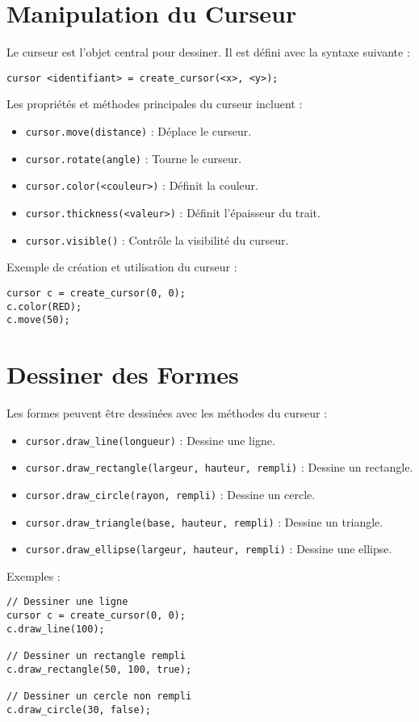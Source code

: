 \documentclass[12pt,a4paper]{report}
\begin{document}
\section{Manipulation du Curseur}
Le curseur est l'objet central pour dessiner. Il est défini avec la syntaxe suivante :
\begin{lstlisting}[language=Draw++]
cursor <identifiant> = create_cursor(<x>, <y>);
\end{lstlisting}
Les propriétés et méthodes principales du curseur incluent :
\begin{itemize}
    \item \texttt{cursor.move(distance)} : Déplace le curseur.
    \item \texttt{cursor.rotate(angle)} : Tourne le curseur.
    \item \texttt{cursor.color(<couleur>)} : Définit la couleur.
    \item \texttt{cursor.thickness(<valeur>)} : Définit l'épaisseur du trait.
    \item \texttt{cursor.visible()} : Contrôle la visibilité du curseur.
\end{itemize}
Exemple de création et utilisation du curseur :
\begin{lstlisting}[language=Draw++]
cursor c = create_cursor(0, 0);
c.color(RED);
c.move(50);
\end{lstlisting}

\section{Dessiner des Formes}
Les formes peuvent être dessinées avec les méthodes du curseur :
\begin{itemize}
    \item \texttt{cursor.draw\_line(longueur)} : Dessine une ligne.
    \item \texttt{cursor.draw\_rectangle(largeur, hauteur, rempli)} : Dessine un rectangle.
    \item \texttt{cursor.draw\_circle(rayon, rempli)} : Dessine un cercle.
    \item \texttt{cursor.draw\_triangle(base, hauteur, rempli)} : Dessine un triangle.
    \item \texttt{cursor.draw\_ellipse(largeur, hauteur, rempli)} : Dessine une ellipse.
\end{itemize}
Exemples :
\begin{lstlisting}[language=Draw++]
// Dessiner une ligne
cursor c = create_cursor(0, 0);
c.draw_line(100);

// Dessiner un rectangle rempli
c.draw_rectangle(50, 100, true);

// Dessiner un cercle non rempli
c.draw_circle(30, false);
\end{lstlisting}
\end{document}
